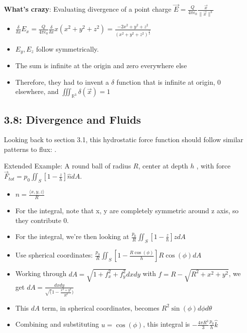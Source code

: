 \documentclass[11pt, oneside]{article}   	%
\begin{document}
\textbf{What's crazy}: Evaluating divergence of a point charge $\vec{E} = \frac{Q}{4 \pi \epsilon_0}\frac{\vec{x}}{\|\vec{x}\|^3}$
\begin{itemize}
\item $\frac{\delta}{\delta x} E_x = \frac{Q}{4 \pi \epsilon_0} \frac{\delta}{\delta x} x (x^2+y^2+z^2) = \frac{-2x^2 + y^2 + z^2}{(x^2 + y^2 + z^2)^\frac{5}{2}}$
\item $E_y, E_z$ follow symmetrically.
\item The sum is infinite at the origin and zero everywhere else
\item Therefore, they had to invent a $\delta$ function that is infinite at origin, 0 elsewhere, and $\iiint_{\mathbb{R}^3} \delta({\vec{x}}) = 1$
\end{itemize}

\subsection{3.8: Divergence and Fluids}

Looking back to section 3.1, this hydrostatic force function should follow similar patterns to flux: .

Extended Example: A round ball of radius $R$, center at depth $h$ , with force $\vec{F}_{tot} = p_0 \iint_S [1 - \frac{z}{h}] \hat{n} dA$.
\begin{itemize}
\item $\hat{n} = \frac{\langle x, y, z \rangle}{R}$
\item For the integral, note that x, y are completely symmetric around z axis, so they contribute 0.
\item For the integral, we're then looking at  $\frac{p_0}{R} \iint_S [1 - \frac{z}{h}]zdA$
\item Use spherical coordinates: $\frac{p_0}{R} \iint_S [1 - \frac{R\cos(\phi)}{h}] R\cos(\phi)dA$
\item Working through $dA = \sqrt{1 + f_x^2 + f_y^2}dx dy$ with $f = R - \sqrt{R^2 + x^2 + y^2}$, we get $dA = \frac{dxdy}{\sqrt(1 - \frac{x^2 + y^2}{R^2})}$
\item This $dA$ term, in spherical coordinates, becomes $R^2 \sin(\phi)d\phi d\theta$
\item Combining and substituting $u = \cos(\phi)$, this integral is $-\frac{4\pi R^3}{3}\frac{p_0}{h}\hat{k}$
\end{itemize}
\end{document}
